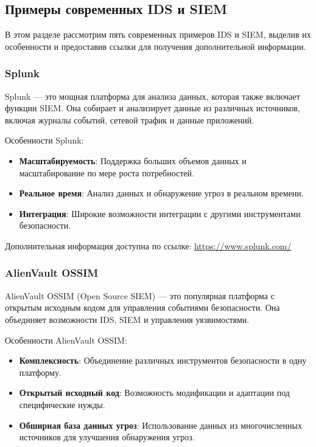 \subsection{Примеры современных IDS и SIEM}

В этом разделе рассмотрим пять современных примеров IDS и SIEM, выделив их особенности и предоставив ссылки для получения дополнительной информации.

\subsubsection{Splunk}

Splunk — это мощная платформа для анализа данных, которая также включает функции SIEM. Она собирает и анализирует данные из различных источников, включая журналы событий, сетевой трафик и данные приложений.

Особенности Splunk:
\begin{itemize}
    \item \textbf{Масштабируемость}: Поддержка больших объемов данных и масштабирование по мере роста потребностей.
    \item \textbf{Реальное время}: Анализ данных и обнаружение угроз в реальном времени.
    \item \textbf{Интеграция}: Широкие возможности интеграции с другими инструментами безопасности.

\end{itemize}

Дополнительная информация доступна по ссылке: \url{https://www.splunk.com/}

\subsubsection{AlienVault OSSIM}

AlienVault OSSIM (Open Source SIEM) — это популярная платформа с открытым исходным кодом для управления событиями безопасности. Она объединяет возможности IDS, SIEM и управления уязвимостями.

Особенности AlienVault OSSIM:
\begin{itemize}
    \item \textbf{Комплексность}: Объединение различных инструментов безопасности в одну платформу.
    \item \textbf{Открытый исходный код}: Возможность модификации и адаптации под специфические нужды.
    \item \textbf{Обширная база данных угроз}: Использование данных из многочисленных источников для улучшения обнаружения угроз.
\end{itemize}

